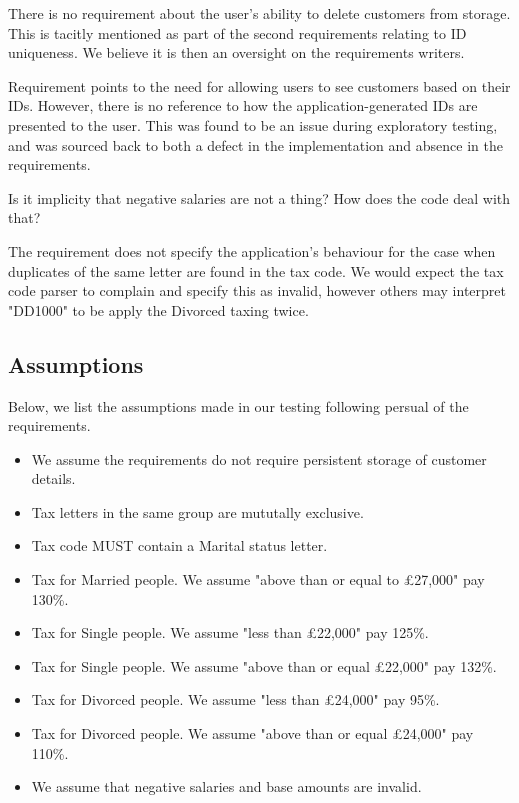 There is no requirement about the user's ability to delete customers from storage. This is tacitly mentioned as part of the second requirements relating to ID uniqueness. We believe it is then an oversight on the requirements writers. 
\par
Requirement \RFour \space points to the need for allowing users to see customers based on their IDs. However, there is no reference to how the application-generated IDs are presented to the user. This was found to be an issue during exploratory testing, and was sourced back to both a defect in the implementation and absence in the requirements. 
\par
Is it implicity that negative salaries are not a thing? How does the code deal with that? 
\par
The requirement does not specify the application's behaviour for the case when duplicates of the same letter are found in the tax code. We would expect the tax code parser to complain and specify this as invalid, however others may interpret "DD1000" to be apply the Divorced taxing twice. 

\subsection{Assumptions}

Below, we list the assumptions made in our testing following persual of the requirements. 

\begin{itemize}
    \item We assume the requirements do not require persistent storage of customer details.
    \item Tax letters in the same group are mututally exclusive. 
    \item Tax code MUST contain a Marital status letter. 
    \item Tax for Married people. We assume "above than or equal to £27,000" pay 130\%. 
    \item Tax for Single people. We assume "less than £22,000" pay 125\%. 
    \item Tax for Single people. We assume "above than or equal £22,000" pay 132\%. 
    \item Tax for Divorced people. We assume "less than £24,000" pay 95\%.
    \item Tax for Divorced people. We assume "above than or equal £24,000" pay 110\%.
    \item We assume that negative salaries and base amounts are invalid.
\end{itemize}


